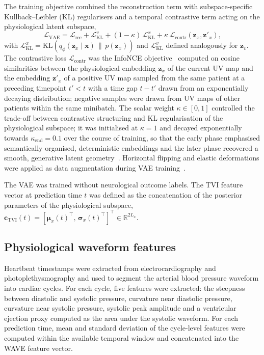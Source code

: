 \documentclass[pdflatex,sn-basic,Numbered]{sn-jnl}
\theoremstyle{thmstyleone}%
\theoremstyle{thmstyletwo}%
\theoremstyle{thmstylethree}%
\begin{document}
The training objective combined the reconstruction term with subspace-specific Kullback--Leibler (KL) regularisers and a temporal contrastive term acting on the physiological latent subspace,
\[
  \mathcal{L}_{\mathrm{VAE}} = \mathcal{L}_{\mathrm{rec}} + \mathcal{L}^{v}_{\mathrm{KL}} + (1-\kappa)\,\mathcal{L}^{x}_{\mathrm{KL}} + \kappa\,\mathcal{L}_{\mathrm{contr}}(\mathbf{z}_{x},\mathbf{z}'_{x}),
\]
with $\mathcal{L}^{x}_{\mathrm{KL}} = \mathrm{KL}\!\left(q_{\phi}(\mathbf{z}_{x}\mid\mathbf{x})\,\|\,p(\mathbf{z}_{x})\right)$ and $\mathcal{L}^{v}_{\mathrm{KL}}$ defined analogously for $\mathbf{z}_{v}$. The contrastive loss $\mathcal{L}_{\mathrm{contr}}$ was the InfoNCE objective~\citep{oord2018representation} computed on cosine similarities between the physiological embedding $\mathbf{z}_{x}$ of the current UV map and the embedding $\mathbf{z}'_{x}$ of a positive UV map sampled from the same patient at a preceding timepoint $t'<t$ with a time gap $t-t'$ drawn from an exponentially decaying distribution; negative samples were drawn from UV maps of other patients within the same minibatch. The scalar weight $\kappa\in[0,1]$ controlled the trade-off between contrastive structuring and KL regularisation of the physiological subspace; it was initialised at $\kappa=1$ and decayed exponentially towards $\kappa_{\mathrm{end}}=0.1$ over the course of training, so that the early phase emphasised semantically organised, deterministic embeddings and the later phase recovered a smooth, generative latent geometry~\citep{qian2021spatiotemporal}. Horizontal flipping and elastic deformations were applied as data augmentation during VAE training~\citep{ronneberger2015u}.

The VAE was trained without neurological outcome labels. The TVI feature vector at prediction time $t$ was defined as the concatenation of the posterior parameters of the physiological subspace, $\mathbf{c}_{\mathrm{TVI}}(t)=\left[\bm{\mu}_{x}(t)^{\top},\,\bm{\sigma}_{x}(t)^{\top}\right]^{\top}\in\mathbb{R}^{2L_{x}}$.

\subsection{Physiological waveform features}

Heartbeat timestamps were extracted from electrocardiography and photoplethysmography and used to segment the arterial blood pressure waveform into cardiac cycles. For each cycle, five features were extracted: the steepness between diastolic and systolic pressure, curvature near diastolic pressure, curvature near systolic pressure, systolic peak amplitude and a ventricular ejection proxy computed as the area under the systolic waveform. For each prediction time, mean and standard deviation of the cycle-level features were computed within the available temporal window and concatenated into the WAVE feature vector.
\end{document}

